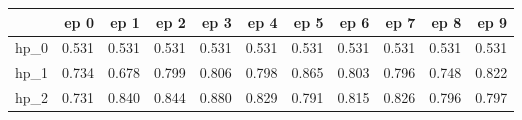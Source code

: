 \begin{tabular}{lrrrrrrrrrr}
\toprule
{} &   ep 0 &   ep 1 &   ep 2 &   ep 3 &   ep 4 &   ep 5 &   ep 6 &   ep 7 &   ep 8 &   ep 9 \\
\midrule
hp\_0 &  0.531 &  0.531 &  0.531 &  0.531 &  0.531 &  0.531 &  0.531 &  0.531 &  0.531 &  0.531 \\
hp\_1 &  0.734 &  0.678 &  0.799 &  0.806 &  0.798 &  0.865 &  0.803 &  0.796 &  0.748 &  0.822 \\
hp\_2 &  0.731 &  0.840 &  0.844 &  0.880 &  0.829 &  0.791 &  0.815 &  0.826 &  0.796 &  0.797 \\
\bottomrule
\end{tabular}
